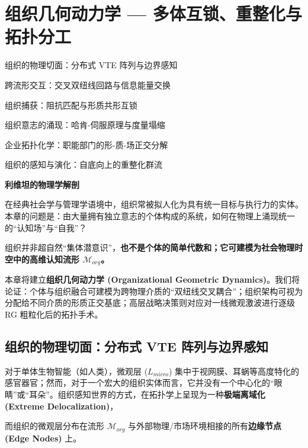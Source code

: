 \chapter{组织几何动力学 — 多体互锁、重整化与拓扑分工}
\label{chp:organizational_geometric_dynamics}

\begin{introduction}
    \item 组织的物理切面：分布式 VTE 阵列与边界感知
    \item 跨流形交互：交叉双纽线回路与信息能量交换
    \item 组织捕获：阻抗匹配与形质共形互锁
    \item 组织意志的涌现：哈肯-伺服原理与度量塌缩
    \item 企业拓扑化学：职能部门的形-质-场正交分解
    \item 组织的感知与演化：自底向上的重整化群流
\end{introduction}

\begin{bquote}
    \textbf{利维坦的物理学解剖}

    \vspace{1em}在经典社会学与管理学语境中，组织常被拟人化为具有统一目标与执行力的实体。本章的问题是：由大量拥有独立意志的个体构成的系统，如何在物理上涌现统一的“认知场”与“自我”？

    \vspace{1em}组织并非超自然“集体潜意识”，\textbf{也不是个体的简单代数和；它可建模为社会物理时空中的高维认知流形 $\mathcal{M}_{org}$。}

    \vspace{1em}本章将建立\textbf{组织几何动力学 (Organizational Geometric Dynamics)}。我们将论证：个体与组织融合可建模为跨物理介质的“双纽线交叉耦合”；组织架构可视为分配给不同介质的形质正交基底；高层战略决策则对应对一线微观激波进行逐级 RG 粗粒化后的拓扑手术。
\end{bquote}

\section{组织的物理切面：分布式 VTE 阵列与边界感知}
\label{sec:org_distributed_vte}

对于单体生物智能（如人类），微观层 ($L_{micro}$) 集中于视网膜、耳蜗等高度特化的感官器官；然而，对于一个宏大的组织实体而言，它并没有一个中心化的“眼睛”或“耳朵”。组织感知世界的方式，在拓扑学上呈现为一种\textbf{极端离域化 (Extreme Delocalization)}，

而组织的微观层分布在流形 $\mathcal{M}_{org}$ 与外部物理/市场环境相接的所有\textbf{边缘节点 (Edge Nodes)} 上。

